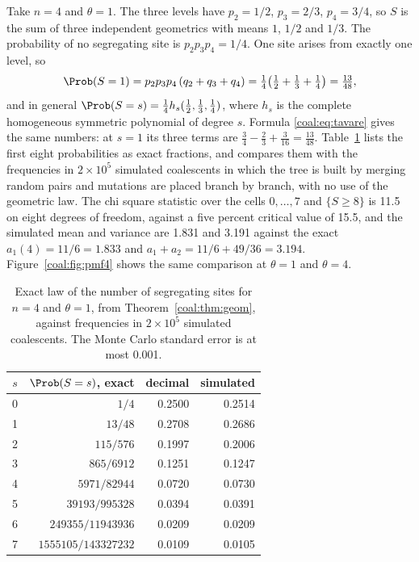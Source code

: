 \begin{example}\label{coal:ex:n4}
Take $n=4$ and $\theta=1$. The three levels have $p_2=1/2$, $p_3=2/3$, $p_4=3/4$, so $S$ is the sum of three independent geometrics with means $1$, $1/2$ and $1/3$. The probability of no segregating site is $p_2p_3p_4=1/4$. One site arises from exactly one level, so
\[
\Prob(S=1)=p_2p_3p_4\,(q_2+q_3+q_4)=\tfrac14\bigl(\tfrac12+\tfrac13+\tfrac14\bigr)=\tfrac{13}{48},
\]
and in general $\Prob(S=s)=\tfrac14 h_s(\tfrac12,\tfrac13,\tfrac14)$, where $h_s$ is the complete homogeneous symmetric polynomial of degree $s$. Formula \eqref{coal:eq:tavare} gives the same numbers: at $s=1$ its three terms are $\tfrac34-\tfrac23+\tfrac3{16}=\tfrac{13}{48}$. Table~\ref{coal:tab:n4} lists the first eight probabilities as exact fractions, and compares them with the frequencies in $2\times10^5$ simulated coalescents in which the tree is built by merging random pairs and mutations are placed branch by branch, with no use of the geometric law. The chi square statistic over the cells $0,\dots,7$ and $\{S\ge8\}$ is 11.5 on eight degrees of freedom, against a five percent critical value of 15.5, and the simulated mean and variance are 1.831 and 3.191 against the exact $a_1(4)=11/6=1.833$ and $a_1+a_2=11/6+49/36=3.194$. Figure~\ref{coal:fig:pmf4} shows the same comparison at $\theta=1$ and $\theta=4$.
\end{example}

\begin{table}[t]
\centering
\small
\begin{tabular}{crrr}
\toprule
$s$ & $\Prob(S=s)$, exact & decimal & simulated\\
\midrule
0 & $1/4$ & 0.2500 & 0.2514\\
1 & $13/48$ & 0.2708 & 0.2686\\
2 & $115/576$ & 0.1997 & 0.2006\\
3 & $865/6912$ & 0.1251 & 0.1247\\
4 & $5971/82944$ & 0.0720 & 0.0730\\
5 & $39193/995328$ & 0.0394 & 0.0391\\
6 & $249355/11943936$ & 0.0209 & 0.0209\\
7 & $1555105/143327232$ & 0.0109 & 0.0105\\
\bottomrule
\end{tabular}
\caption{Exact law of the number of segregating sites for $n=4$ and $\theta=1$, from Theorem~\ref{coal:thm:geom}, against frequencies in $2\times10^5$ simulated coalescents. The Monte Carlo standard error is at most 0.001.}
\label{coal:tab:n4}
\end{table}

